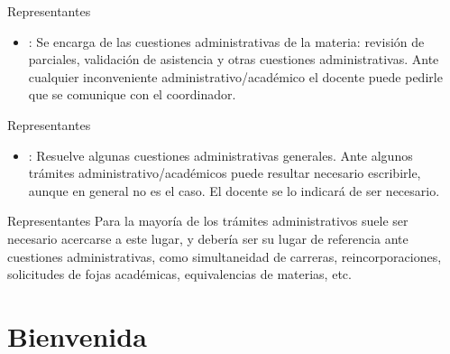 
\begin{frame}{Representantes}
  \begin{itemize}
    \item {}: Se encarga de las cuestiones
      administrativas de la materia: revisión de parciales, validación de
      asistencia y otras cuestiones administrativas.
      \jump
      Ante cualquier inconveniente administrativo/académico el docente puede
      pedirle que se comunique con el coordinador.
  \end{itemize}
\end{frame}


\begin{frame}{Representantes}
  \begin{itemize}
    \item {}: Resuelve algunas
      cuestiones administrativas generales.
      \jump
      Ante algunos trámites administrativo/académicos puede resultar necesario
      escribirle, aunque en general no es el caso. El docente se lo indicará de
      ser necesario.
  \end{itemize}
\end{frame}


\begin{frame}{Representantes}
  \jump
  Para la mayoría de los trámites administrativos suele ser necesario acercarse a
  este lugar, y debería ser su lugar de referencia ante cuestiones administrativas,
  como simultaneidad de carreras, reincorporaciones, solicitudes de fojas académicas,
  equivalencias de materias, etc.
\end{frame}


\section{Bienvenida}


